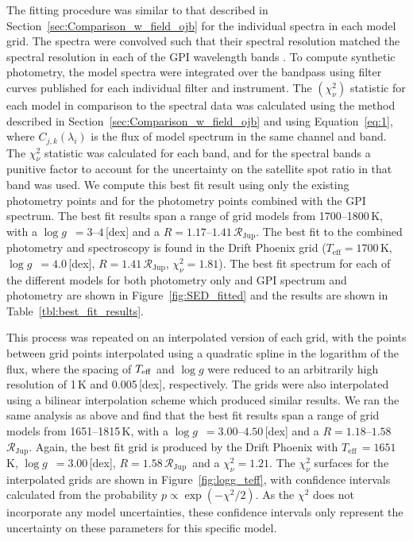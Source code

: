 \documentclass[twocolumn]{aastex6}
\newcommand{\teff}{$T_\mathrm{eff}$}
\newcommand{\logg}{$\log g$~}
\newcommand{\rjup}{$\mathcal{R}_\mathrm{Jup}$}
\begin{document}
The fitting procedure was similar to that described in Section~\ref{sec:Comparison_w_field_ojb} for the individual spectra in each model grid. The spectra were convolved such that their spectral resolution matched the spectral resolution in each of the GPI wavelength bands \citep{Larkin2014}. To compute synthetic photometry, the model spectra were integrated over the bandpass using filter curves published for each individual filter and instrument. The $(\chi^2_{\nu})$ statistic for each model in comparison to the spectral data was calculated using the method described in Section~\ref{sec:Comparison_w_field_ojb} and using Equation~\eqref{eq:1}, where $C_{j, k}(\lambda_i)$ is the flux of model spectrum in the same channel and band. The $\chi^2_{\nu}$ statistic was calculated for each band, and for the spectral bands a punitive factor to account for the uncertainty on the satellite spot ratio in that band was used. We compute this best fit result using only the existing photometry points and for the photometry points combined with the GPI spectrum. The best fit results span a range of grid models from 1700--1800\,K, with a \logg$=3$--$4$\,[dex] and a $R = 1.17$--$1.41$\,\rjup. The best fit to the combined photometry and spectroscopy is found in the {\sc Drift Phoenix} grid (\teff$ = 1700$\,K, \logg$=4.0$\,[dex], $R=1.41$\,\rjup, $\chi^{2}_{\nu} = 1.81$). The best fit spectrum for each of the different models for both photometry only and GPI spectrum and photometry are shown in Figure~\ref{fig:SED_fitted} and the results are shown in Table~\ref{tbl:best_fit_results}.

This process was repeated on an interpolated version of each grid, with the points between grid points interpolated using a quadratic spline in the logarithm of the flux, where the spacing of $T_{\rm eff}$ and $\log g$ were reduced to an arbitrarily high resolution of 1\,K and 0.005\,[dex], respectively. The grids were also interpolated using a bilinear interpolation scheme which produced similar results. We ran the same analysis as above and find that the best fit results span a range of grid models from 1651--1815\,K, with a \logg$= 3.00$--$4.50$\,[dex] and a $R = 1.18$--$1.58$\,\rjup. Again, the best fit grid is produced by the {\sc Drift Phoenix} with \teff\,$ = 1651$\,K, \logg$=3.00$\,[dex], $R=1.58$\,\rjup\ and a $\chi^{2}_{\nu} = 1.21$. The $\chi^2_{\nu}$ surfaces for the interpolated grids are shown in Figure~\ref{fig:logg_teff}, with confidence intervals calculated from the probability $p\propto\exp(-\chi^2/2)$. As the $\chi^2$ does not incorporate any model uncertainties, these confidence intervals only represent the uncertainty on these parameters for this specific model.
\end{document}
